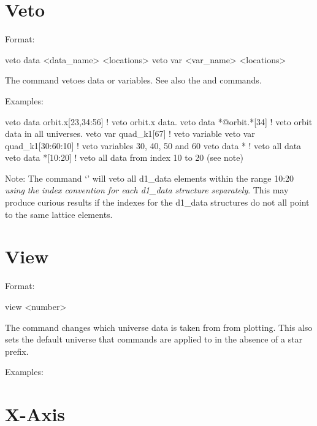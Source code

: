 {{%
\section{Veto}
\label{s:veto}

Format:
\begin{example}
  veto data <data_name> <locations>
  veto var <var_name> <locations>
\end{example}

\vskip 0.2in 
The  command vetoes data or variables. See also the
 and  commands.

Examples:
\begin{example}
  veto data orbit.x[23,34:56]  ! veto orbit.x data.
  veto data *@orbit.*[34]      ! veto orbit data in all universes.
  veto var quad_k1[67]         ! veto variable
  veto var quad_k1[30:60:10]   ! veto variables 30, 40, 50 and 60
  veto data *                  ! veto all data
  veto data *[10:20]           ! veto all data from index 10 to 20 (see note)
\end{example}

Note: The command `' will veto all d1\_data elements
within the range 10:20 \textit{using the index convention for each d1\_data
structure separately}. This may produce curious results if the
indexes for the d1\_data structures do not all point to the same lattice
elements. 

\section{View}
\label{s:view}

Format:
\begin{example}
  view <number>
\end{example}

\vskip 0.2in 
The  command changes which universe data is taken from from
plotting.  This also sets the default universe that commands are
applied to in the absence of a star prefix.

Examples:

\section{X-Axis}
\label{s:x-axis}

}}
